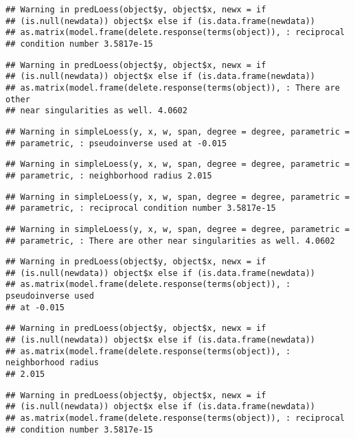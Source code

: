 \documentclass[]{article}
\begin{document}
\begin{verbatim}
## Warning in predLoess(object$y, object$x, newx = if
## (is.null(newdata)) object$x else if (is.data.frame(newdata))
## as.matrix(model.frame(delete.response(terms(object)), : reciprocal
## condition number 3.5817e-15
\end{verbatim}

\begin{verbatim}
## Warning in predLoess(object$y, object$x, newx = if
## (is.null(newdata)) object$x else if (is.data.frame(newdata))
## as.matrix(model.frame(delete.response(terms(object)), : There are other
## near singularities as well. 4.0602
\end{verbatim}

\begin{verbatim}
## Warning in simpleLoess(y, x, w, span, degree = degree, parametric =
## parametric, : pseudoinverse used at -0.015
\end{verbatim}

\begin{verbatim}
## Warning in simpleLoess(y, x, w, span, degree = degree, parametric =
## parametric, : neighborhood radius 2.015
\end{verbatim}

\begin{verbatim}
## Warning in simpleLoess(y, x, w, span, degree = degree, parametric =
## parametric, : reciprocal condition number 3.5817e-15
\end{verbatim}

\begin{verbatim}
## Warning in simpleLoess(y, x, w, span, degree = degree, parametric =
## parametric, : There are other near singularities as well. 4.0602
\end{verbatim}

\begin{verbatim}
## Warning in predLoess(object$y, object$x, newx = if
## (is.null(newdata)) object$x else if (is.data.frame(newdata))
## as.matrix(model.frame(delete.response(terms(object)), : pseudoinverse used
## at -0.015
\end{verbatim}

\begin{verbatim}
## Warning in predLoess(object$y, object$x, newx = if
## (is.null(newdata)) object$x else if (is.data.frame(newdata))
## as.matrix(model.frame(delete.response(terms(object)), : neighborhood radius
## 2.015
\end{verbatim}

\begin{verbatim}
## Warning in predLoess(object$y, object$x, newx = if
## (is.null(newdata)) object$x else if (is.data.frame(newdata))
## as.matrix(model.frame(delete.response(terms(object)), : reciprocal
## condition number 3.5817e-15
\end{verbatim}
\end{document}
